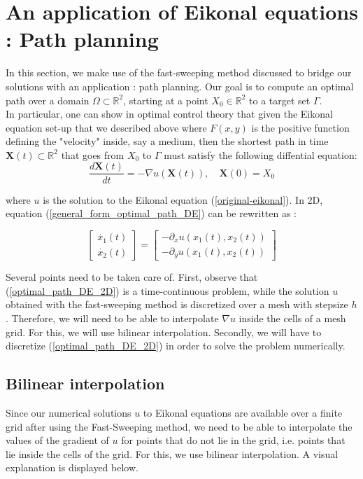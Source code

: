 \documentclass[11pt]{article}
\theoremstyle{definition}
\theoremstyle{remark}
\newcommand{\R}{\mathbb{R}}
\begin{document}
\section{An application of Eikonal equations : Path planning}
\label{path_planning}
In this section, we make use of the fast-sweeping method discussed to bridge our solutions with an application : path planning. Our goal is to compute an optimal path over a domain $\Omega\subset\R^2$, starting at a point $X_0\in \R^2$ to a target set $\Gamma$. \\
In particular, one can show in optimal control theory that given the Eikonal equation set-up that we described above where $F(x,y)$ is the positive function defining the "velocity" inside, say a medium, then the shortest path in time $\textbf{X}(t)\subset \R^2$ that goes from $X_0$ to $\Gamma$ must satisfy the following diffential equation:
\begin{equation}
\label{general_form_optimal_path_DE}
    \frac{d\textbf{X}(t)}{dt}=-\nabla u(\textbf{X}(t)), \quad \textbf{X}(0)=X_0
\end{equation}

\noindent where $u$ is the solution to the Eikonal equation (\ref{original-eikonal}). In 2D, equation (\ref{general_form_optimal_path_DE}) can be rewritten as : 

\begin{equation}
\label{optimal_path_DE_2D}
    \begin{bmatrix}
        \dot{x_1}(t) \\
        \dot{x_2}(t)
    \end{bmatrix} = \begin{bmatrix}
        -\partial_xu(x_1(t),x_2(t)) \\
        -\partial_yu(x_1(t),x_2(t))
    \end{bmatrix}
\end{equation}

\noindent Several points need to be taken care of. First, observe that (\ref{optimal_path_DE_2D}) is a time-continuous problem, while the solution $u$ obtained with the fast-sweeping method is discretized over a mesh with stepsize $h$. Therefore, we will need to be able to interpolate $\nabla u$ inside the cells of a mesh grid. For this, we will use bilinear interpolation. Secondly, we will have to discretize (\ref{optimal_path_DE_2D}) in order to solve the problem numerically.
\subsection{Bilinear interpolation}
Since our numerical solutions $u$ to Eikonal equations are available over a finite grid after using the Fast-Sweeping method, we need to be able to interpolate the values of the gradient of $u$ for points that do not lie in the grid, i.e. points that lie inside the cells of the grid. For this, we use bilinear interpolation. A visual explanation is displayed below.
\end{document}
